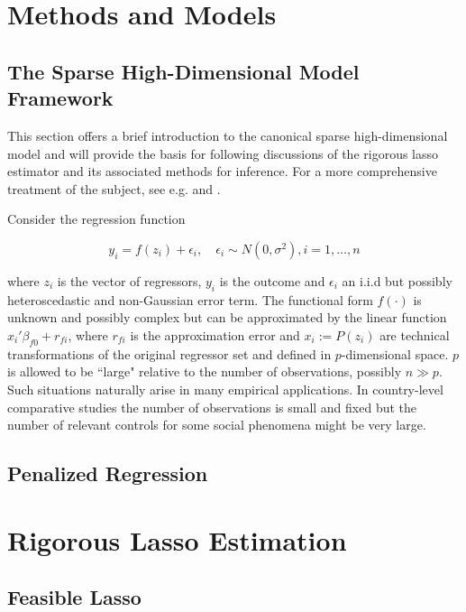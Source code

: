 \documentclass[11pt, reqno]{amsart} \usepackage{pstricks} %
\begin{document}
\section{Methods and Models}
\subsection{The Sparse High-Dimensional Model Framework}

This section offers a brief introduction to the canonical sparse
high-dimensional model and will provide the basis for following discussions of
the rigorous lasso estimator and its associated methods for inference. For a
more comprehensive treatment of the subject, see e.g. \citep{Belloni2013} and
\citep{Belloni2014}. 

Consider the regression function

\begin{equation}
  \label{eq:regression funk}
  y_i = f(z_i) + \epsilon_i, \quad \epsilon_i \sim N(0, \sigma^2), i = 1, \dots, n
\end{equation}

\noindent where $z_i$ is the vector of regressors, $y_i$ is the outcome and
$\epsilon_i$ an i.i.d but possibly heteroscedastic and non-Gaussian error term.
The functional form $f(\cdot)$ is unknown and possibly complex but can be approximated
by the linear function $x_i'\beta_{f0} + r_{fi}$, where $r_{fi}$ is the
approximation error and $x_i:=P(z_i)$ are technical transformations of the
original regressor set and defined in $p$-dimensional space. $p$ is allowed to
be ``large" relative to the number of observations, possibly $n \gg p$. Such
situations naturally arise in many empirical applications. In country-level
comparative studies the number of observations is small and fixed but the
number of relevant controls for some social phenomena might be very large. 

\subsection{Penalized Regression}

\section{Rigorous Lasso Estimation}

\subsection{Feasible Lasso}
\end{document}

